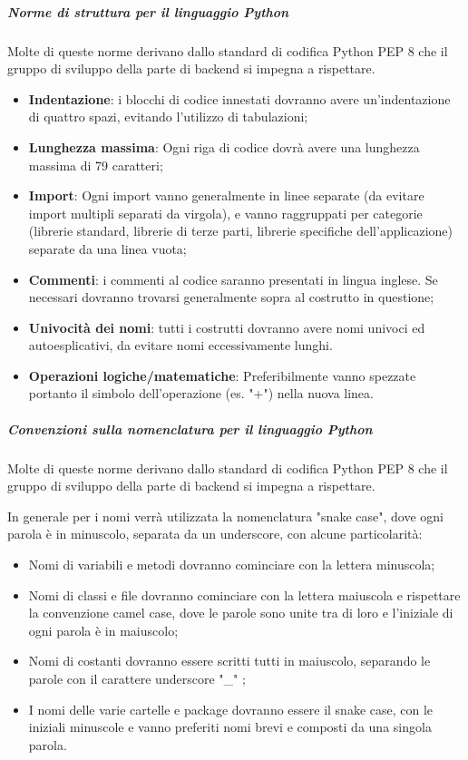 \subparagraph{Norme di struttura per il linguaggio Python}
Molte di queste norme derivano dallo standard di codifica Python PEP 8 che il gruppo di sviluppo della parte di backend si impegna a rispettare.
\begin{itemize}
\item \textbf{Indentazione}: i blocchi di codice innestati dovranno avere un’indentazione di quattro spazi, evitando l'utilizzo di tabulazioni;
\item \textbf{Lunghezza massima}: Ogni riga di codice dovrà avere una lunghezza massima di 79 caratteri; 
\item \textbf{Import}: Ogni import vanno generalmente in linee separate (da evitare import multipli separati da virgola), e vanno raggruppati per categorie (librerie standard, librerie di terze parti, librerie specifiche dell'applicazione) separate da una linea vuota;
\item \textbf{Commenti}: i commenti al codice saranno presentati in lingua inglese. Se necessari dovranno trovarsi generalmente sopra al costrutto in questione;
\item  \textbf{Univocità dei nomi}: tutti i costrutti dovranno avere nomi univoci ed autoesplicativi, da evitare nomi eccessivamente lunghi.
\item \textbf{Operazioni logiche/matematiche}: Preferibilmente vanno spezzate portanto il simbolo dell'operazione (es. "+") nella nuova linea.
\end{itemize}

\subparagraph{Convenzioni sulla nomenclatura per il linguaggio Python}
Molte di queste norme derivano dallo standard di codifica Python PEP 8 che il gruppo di sviluppo della parte di backend si impegna a rispettare.

In generale per i nomi verrà utilizzata la nomenclatura "snake case", dove ogni parola è in minuscolo, separata da un underscore, con alcune particolarità:
\begin{itemize}
\item Nomi di variabili e metodi dovranno cominciare con la lettera minuscola;
\item Nomi di classi e file dovranno cominciare con la lettera maiuscola e rispettare la convenzione camel case, dove le parole sono unite tra di loro e l'iniziale di ogni parola è in maiuscolo;
\item Nomi di costanti dovranno essere scritti tutti in maiuscolo, separando le parole con il carattere underscore "\_" ;
\item I nomi delle varie cartelle e package dovranno essere il snake case, con le iniziali minuscole e vanno preferiti nomi brevi e composti da una singola parola.
\end{itemize}

